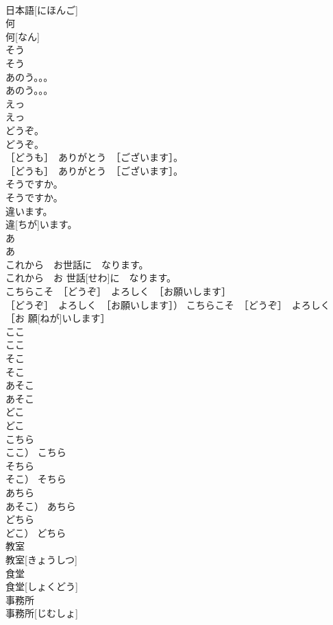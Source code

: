 \documentclass[8pt]{extreport}
\begin{document}
\begin{CJK}{UTF8}{min}
\\	日本語[にほんご]	
\\	何	
\\	何[なん]	
\\	そう	
\\	そう	
\\	あのう。。。	
\\	あのう。。。	
\\	えっ	
\\	えっ	
\\	どうぞ。	
\\	どうぞ。	
\\	［どうも］　ありがとう　［ございます］。	
\\	［どうも］　ありがとう　［ございます］。	
\\	そうですか。	
\\	そうですか。	
\\	違います。	
\\	違[ちが]います。	
\\	あ	
\\	あ	
\\	これから　お世話に　なります。	
\\	これから　お 世話[せわ]に　なります。	
\\	こちらこそ　［どうぞ］　よろしく　［お願いします］	
\\	［どうぞ］　よろしく　［お願いします］）	こちらこそ　［どうぞ］　よろしく　［お 願[ねが]いします］	
\\	ここ	
\\	ここ	
\\	そこ	
\\	そこ	
\\	あそこ	
\\	あそこ	
\\	どこ	
\\	どこ	
\\	こちら	
\\	ここ）	こちら	
\\	そちら	
\\	そこ）	そちら	
\\	あちら	
\\	あそこ）	あちら	
\\	どちら	
\\	どこ）	どちら	
\\	教室	
\\	教室[きょうしつ]	
\\	食堂	
\\	食堂[しょくどう]	
\\	事務所	
\\	事務所[じむしょ]	

\end{CJK}
\end{document}

